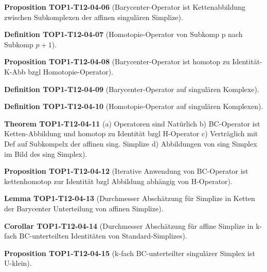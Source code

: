 \documentclass[10pt, letterpaper]{article}
\newcommand{\CustomHeading}[3]{%
  \par\medskip\noindent%
  \textbf{#1 #2} \textnormal{(#3)}.\enskip%
}
\newenvironment{DEF}[2]{\CustomHeading{Definition}{#1}{#2}}{}
\newenvironment{PROP}[2]{\CustomHeading{Proposition}{#1}{#2}}{}
\newenvironment{THEO}[2]{\CustomHeading{Theorem}{#1}{#2}}{}
\newenvironment{LEM}[2]{\CustomHeading{Lemma}{#1}{#2}}{}
\newenvironment{KORO}[2]{\CustomHeading{Corollar}{#1}{#2}}{}
\begin{document}
\begin{PROP}{TOP1-T12-04-06}{Barycenter-Operator ist Kettenabbildung zwischen Subkomplexen der affinen singulären Simplize}
\end{PROP}

\begin{DEF}{TOP1-T12-04-07}{Homotopie-Operator von Subkomp p nach Subkomp $p+1$}
\end{DEF}

\begin{PROP}{TOP1-T12-04-08}{Barycenter-Operator ist homotop zu Identität-K-Abb bzgl Homotopie-Operator}
\end{PROP}

\begin{DEF}{TOP1-T12-04-09}{Barycenter-Operator auf singulären Komplexe}
\end{DEF}

\begin{DEF}{TOP1-T12-04-10}{Homotopie-Operator auf singulären Komplexen}
\end{DEF}

\begin{THEO}{TOP1-T12-04-11}{a) Operatoren sind Natürlich 
b) BC-Operator ist Ketten-Abbildung und homotop zu Identität bzgl H-Operator 
c) Verträglich mit Def auf Subkompelx der affinen sing. Simplize
d) Abbildungen von sing Simplex im Bild des sing Simplex}
\end{THEO}

\begin{PROP}{TOP1-T12-04-12}{Iterative Anwendung von BC-Operator ist kettenhomotop zur Identität bzgl Abbildung abhängig von H-Operator}
\end{PROP}

\begin{LEM}{TOP1-T12-04-13}{Durchmesser Abschätzung für Simplize in Ketten der Barycenter Unterteilung von affinen Simplize}
\end{LEM}

\begin{KORO}{TOP1-T12-04-14}{Durchmesser Abschätzung für affine Simplize in k-fach BC-unterteilten Identitäten von Standard-Simplizes}
\end{KORO}

\begin{PROP}{TOP1-T12-04-15}{k-fach BC-unterteilter singulärer Simplex ist U-klein}
\end{PROP}
\end{document}
